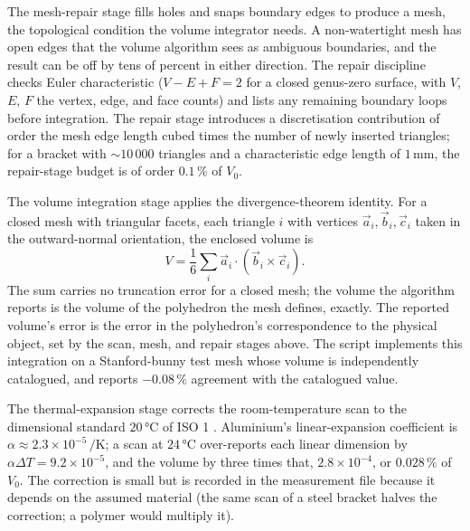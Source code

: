 The mesh-repair stage fills holes and snaps boundary edges to
produce a  mesh, the topological condition the
volume integrator needs. A non-watertight mesh has open edges that
the volume algorithm sees as ambiguous boundaries, and the result
can be off by tens of percent in either direction. The repair
discipline checks Euler characteristic ($V - E + F = 2$ for a closed
genus-zero surface, with $V$, $E$, $F$ the vertex, edge, and face
counts) and lists any remaining boundary loops before integration.
The repair stage introduces a discretisation contribution of order
the mesh edge length cubed times the number of newly inserted
triangles; for a bracket with $\sim 10\,000$ triangles and a
characteristic edge length of $1 \,\si{\milli\meter}$, the
repair-stage budget is of order $0.1\,\%$ of $V_{0}$.

The volume integration stage applies the divergence-theorem
identity. For a closed mesh with triangular facets, each triangle
$i$ with vertices $\vec{a}_{i}, \vec{b}_{i}, \vec{c}_{i}$ taken in
the outward-normal orientation, the enclosed volume is
\[
V = \frac{1}{6} \sum_{i} \vec{a}_{i} \cdot
(\vec{b}_{i} \times \vec{c}_{i}).
\]
The sum carries no truncation error for a closed mesh; the volume
the algorithm reports is the volume of the polyhedron the mesh
defines, exactly. The reported volume's error is the error in the
polyhedron's correspondence to the physical object, set by the
scan, mesh, and repair stages above. The
script implements this integration on a Stanford-bunny test mesh
whose volume is independently catalogued, and reports $-0.08\,\%$
agreement with the catalogued value.

The thermal-expansion stage corrects the room-temperature scan to
the dimensional standard $20 \,\si{\degreeCelsius}$ of ISO 1
\cite{std:iso-1-2022}. Aluminium's linear-expansion coefficient is
$\alpha \approx 2.3 \times 10^{-5} \,\si{\per\kelvin}$; a scan at
$24 \,\si{\degreeCelsius}$ over-reports each linear dimension by
$\alpha \Delta T = 9.2 \times 10^{-5}$, and the volume by three
times that, $2.8 \times 10^{-4}$, or $0.028\,\%$ of $V_{0}$. The
correction is small but is recorded in the measurement file because
it depends on the assumed material (the same scan of a steel
bracket halves the correction; a polymer would multiply it).

